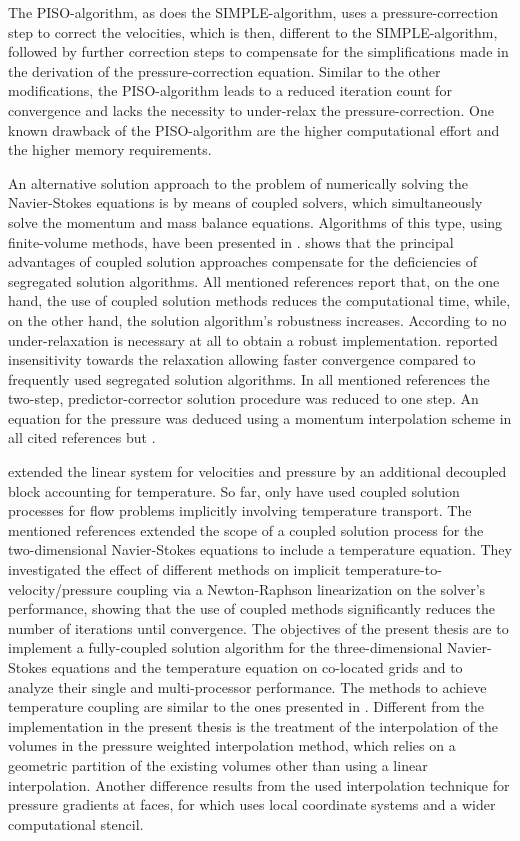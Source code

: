 The PISO-algorithm, as does the SIMPLE-algorithm, uses a pressure-correction step to correct the velocities, which is then, different to the SIMPLE-algorithm, followed by further correction steps to compensate for the simplifications made in the derivation of the pressure-correction equation. Similar to the other modifications, the PISO-algorithm leads to a reduced iteration count for convergence and lacks the necessity to under-relax the pressure-correction. One known drawback of the PISO-algorithm are the higher computational effort and the higher memory requirements.

An alternative solution approach to the problem of numerically solving the Navier-Stokes equations is by means of coupled solvers, which simultaneously solve the momentum and mass balance equations. Algorithms of this type, using finite-volume methods, have been presented in \cite{chen10,darwish09,falk13,galpin86,klaij13,mangani14,vakilipour12}. \cite{darwish09} shows that the principal advantages of coupled solution approaches compensate for the deficiencies of segregated solution algorithms. All mentioned references report that, on the one hand, the use of coupled solution methods reduces the computational time, while, on the other hand, the solution algorithm's robustness increases. According to \cite{darwish09} no under-relaxation is necessary at all to obtain a robust implementation. \cite{galpin86} reported insensitivity towards the relaxation allowing faster convergence compared to frequently used segregated solution algorithms. In all mentioned references the two-step, predictor-corrector solution procedure was reduced to one step. An equation for the pressure was deduced using a momentum interpolation scheme \cite{rhie82} in all cited references but \cite{galpin86}.

\cite{chen10} extended the linear system for velocities and pressure by an additional decoupled block accounting for temperature. So far, only \cite{galpin86,vakilipour12} have used coupled solution processes for flow problems implicitly involving temperature transport. The mentioned references extended the scope of a coupled solution process for the two-dimensional Navier-Stokes equations to include a temperature equation. They investigated the effect of different methods on implicit temperature-to-velocity/pressure coupling via a Newton-Raphson linearization on the solver's performance, showing that the use of coupled methods significantly reduces the number of iterations until convergence. The objectives of the present thesis are to implement a fully-coupled solution algorithm for the three-dimensional Navier-Stokes equations and the temperature equation on co-located grids and to analyze their single and multi-processor performance. The methods to achieve temperature coupling are similar to the ones presented in \cite{vakilipour12}. Different from the implementation in the present thesis is the treatment of the interpolation of the volumes in the pressure weighted interpolation method, which relies on a geometric partition of the existing volumes other than using a linear interpolation. Another difference results from the used interpolation technique for pressure gradients at faces, for which \cite{vakilipour12} uses local coordinate systems and a wider computational stencil.

